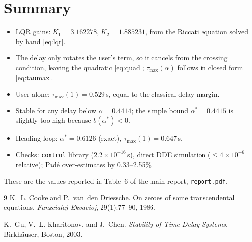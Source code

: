 \documentclass[11pt,a4paper]{article}
\newcommand{\code}[1]{\texttt{#1}}
\theoremstyle{definition}
\begin{document}
\section*{Summary}
\begin{itemize}\setlength{\itemsep}{1pt}
\item LQR gains: $K_1 = 3.162278$, $K_2 = 1.885231$, from the Riccati
equation solved by hand \eqref{eq:lqr}.
\item The delay only rotates the user's term, so it cancels from the
crossing condition, leaving the quadratic \eqref{eq:quad};
$\tau_{\max}(\alpha)$ follows in closed form \eqref{eq:taumax}.
\item User alone: $\tau_{\max}(1) = 0.529$\,s, equal to the classical
delay margin.
\item Stable for any delay below $\alpha = 0.4414$; the simple bound
$\alpha^* = 0.4415$ is slightly too high because $b(\alpha^*) < 0$.
\item Heading loop: $\alpha^* = 0.6126$ (exact), $\tau_{\max}(1) = 0.647$\,s.
\item Checks: \code{control} library ($2.2\times10^{-16}$\,s), direct
DDE simulation ($\le 4\times10^{-6}$ relative); Pad\'e over-estimates by
0.33--2.55\%.
\end{itemize}
These are the values reported in Table~6 of the main report,
\code{report.pdf}.

\begin{thebibliography}{9}\small
{}
K.~L. Cooke and P.~van~den Driessche.
On zeroes of some transcendental equations.
\emph{Funkcialaj Ekvacioj}, 29(1):77--90, 1986.

K.~Gu, V.~L. Kharitonov, and J.~Chen.
\emph{Stability of Time-Delay Systems}.
Birkh\"auser, Boston, 2003.
\end{thebibliography}
\end{document}
